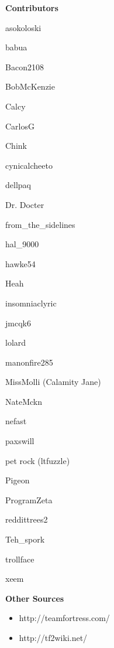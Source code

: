 {\bf Contributors}
\begin{packed_item}
\item asokoloski
\item babua
\item Bacon2108
\item BobMcKenzie
\item Calcy
\item CarlosG
\item Chink
\item cynicalcheeto
\item dellpaq
\item Dr. Docter
\item from\_the\_sidelines
\item hal\_9000
\item hawke54
\item Heah
\item insomniaclyric
\item jmcqk6
\item lolard
\item manonfire285
\item MissMolli (Calamity Jane)
\item NateMckn
\item nefast
\item paxswill
\item pet rock (ltfuzzle)
\item Pigeon
\item ProgramZeta
\item reddittrees2
\item Teh\_spork
\item trollface
\item xeem
\end{packed_item}

 
{\bf Other Sources}
\begin{itemize}
\item http://teamfortress.com/
\item http://tf2wiki.net/
\end{itemize}